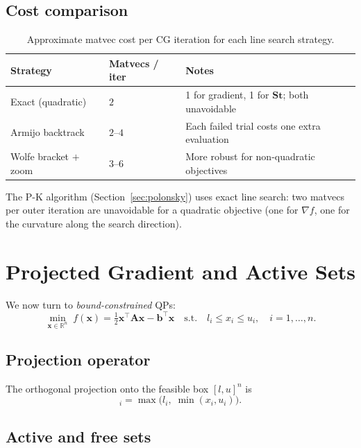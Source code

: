 \documentclass[11pt,a4paper]{article}
\newcommand{\R}{\mathbb{R}}
\newcommand{\bA}{\mathbf{A}}
\newcommand{\bS}{\mathbf{S}}
\newcommand{\bb}{\mathbf{b}}
\newcommand{\bt}{\mathbf{t}}
\newcommand{\bx}{\mathbf{x}}
\newcommand{\Proj}{\mathcal{P}}
\newcommand{\tr}{\top}
\begin{document}
\subsection{Cost comparison}

\begin{table}[ht]
\centering
\caption{Approximate matvec cost per CG iteration for each line search strategy.}
\label{tab:ls-cost}
\begin{tabular}{@{}lll@{}}
\toprule
Strategy & Matvecs / iter & Notes \\
\midrule
Exact (quadratic)       & $2$ & 1 for gradient, 1 for $\bS\bt$; both unavoidable \\
Armijo backtrack        & $2$--$4$ & Each failed trial costs one extra evaluation \\
Wolfe bracket $+$ zoom  & $3$--$6$ & More robust for non-quadratic objectives \\
\bottomrule
\end{tabular}
\end{table}

The P-K algorithm (Section~\ref{sec:polonsky}) uses exact line search:
two matvecs per outer iteration are unavoidable for a quadratic objective
(one for $\nabla f$, one for the curvature along the search direction).

\section{Projected Gradient and Active Sets}
\label{sec:projection}

We now turn to \emph{bound-constrained} QPs:
\begin{equation}
  \min_{\bx \in \R^n}\; f(\bx) = \tfrac{1}{2}\bx^\tr\bA\bx - \bb^\tr\bx
  \quad \text{s.t.}\quad l_i \leq x_i \leq u_i,\quad i = 1,\ldots,n.
  \label{eq:bqp}
\end{equation}

\subsection{Projection operator}

The orthogonal projection onto the feasible box $[l,u]^n$ is
\begin{equation}
  [\Proj(\bx)]_i = \max\!\bigl(l_i,\;\min(x_i, u_i)\bigr).
  \label{eq:projection}
\end{equation}

\subsection{Active and free sets}
\end{document}
